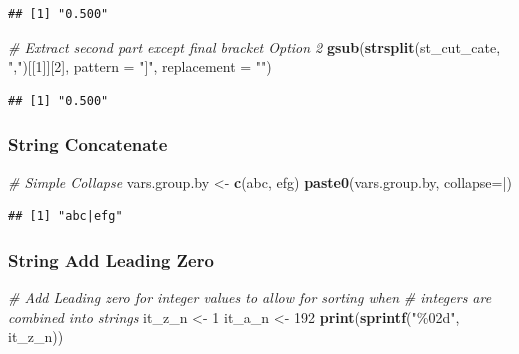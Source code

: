 \documentclass[
]{book}
\newenvironment{Shaded}{\begin{snugshade}}{\end{snugshade}}
\newcommand{\CommentTok}[1]{\textcolor[rgb]{0.56,0.35,0.01}{\textit{#1}}}
\newcommand{\DataTypeTok}[1]{\textcolor[rgb]{0.13,0.29,0.53}{#1}}
\newcommand{\DecValTok}[1]{\textcolor[rgb]{0.00,0.00,0.81}{#1}}
\newcommand{\KeywordTok}[1]{\textcolor[rgb]{0.13,0.29,0.53}{\textbf{#1}}}
\newcommand{\NormalTok}[1]{#1}
\newcommand{\StringTok}[1]{\textcolor[rgb]{0.31,0.60,0.02}{#1}}
\begin{document}
\begin{verbatim}
## [1] "0.500"
\end{verbatim}

\begin{Shaded}
\begin{Highlighting}[]
\CommentTok{\# Extract second part except final bracket Option 2}
\KeywordTok{gsub}\NormalTok{(}\KeywordTok{strsplit}\NormalTok{(st\_cut\_cate, }\StringTok{","}\NormalTok{)[[}\DecValTok{1}\NormalTok{]][}\DecValTok{2}\NormalTok{],  }\DataTypeTok{pattern =} \StringTok{"]"}\NormalTok{, }\DataTypeTok{replacement =} \StringTok{""}\NormalTok{)}
\end{Highlighting}
\end{Shaded}

\begin{verbatim}
## [1] "0.500"
\end{verbatim}

\hypertarget{string-concatenate}{%
\subsubsection{String Concatenate}\label{string-concatenate}}

\begin{Shaded}
\begin{Highlighting}[]
\CommentTok{\# Simple Collapse}
\NormalTok{vars.group.by \textless{}{-}}\StringTok{ }\KeywordTok{c}\NormalTok{(}\StringTok{\textquotesingle{}abc\textquotesingle{}}\NormalTok{, }\StringTok{\textquotesingle{}efg\textquotesingle{}}\NormalTok{)}
\KeywordTok{paste0}\NormalTok{(vars.group.by, }\DataTypeTok{collapse=}\StringTok{\textquotesingle{}|\textquotesingle{}}\NormalTok{)}
\end{Highlighting}
\end{Shaded}

\begin{verbatim}
## [1] "abc|efg"
\end{verbatim}

\hypertarget{string-add-leading-zero}{%
\subsubsection{String Add Leading Zero}\label{string-add-leading-zero}}

\begin{Shaded}
\begin{Highlighting}[]
\CommentTok{\# Add Leading zero for integer values to allow for sorting when}
\CommentTok{\# integers are combined into strings}
\NormalTok{it\_z\_n \textless{}{-}}\StringTok{ }\DecValTok{1}
\NormalTok{it\_a\_n \textless{}{-}}\StringTok{ }\DecValTok{192}
\KeywordTok{print}\NormalTok{(}\KeywordTok{sprintf}\NormalTok{(}\StringTok{"\%02d"}\NormalTok{, it\_z\_n))}
\end{Highlighting}
\end{Shaded}
\end{document}

